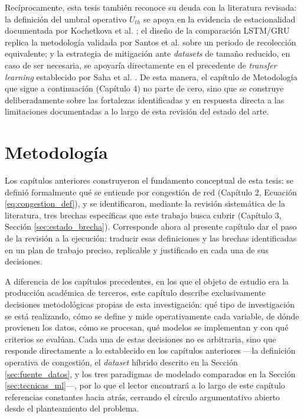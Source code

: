 \documentclass[12pt]{report}
\begin{document}
Recíprocamente, esta tesis también reconoce su deuda con la literatura revisada: la definición del umbral operativo $U_{th}$ se apoya en la evidencia de estacionalidad documentada por Kochetkova et al. \cite{kochetkova2023}; el diseño de la comparación LSTM/GRU replica la metodología validada por Santos et al. \cite{santos2022} sobre un periodo de recolección equivalente; y la estrategia de mitigación ante \textit{datasets} de tamaño reducido, en caso de ser necesaria, 
se apoyaría directamente en el precedente de \textit{transfer learning} establecido por Saha et al. \cite{saha2024}. De esta manera, el capítulo de Metodología que sigue a continuación (Capítulo 4) no parte de cero, sino que se construye deliberadamente sobre las fortalezas identificadas y en respuesta directa a las limitaciones documentadas a lo largo de esta revisión del estado del arte.

\chapter{Metodología}
\label{cap:metodologia}

Los capítulos anteriores construyeron el fundamento conceptual de esta tesis: se definió formalmente qué se entiende por congestión de red (Capítulo 2, Ecuación \ref{eq:congestion_def}), y se identificaron, mediante la revisión sistemática de la literatura, tres brechas específicas que este trabajo busca cubrir (Capítulo 3, Sección \ref{sec:estado_brecha}). Corresponde ahora al presente capítulo dar el paso de la revisión a la ejecución: traducir esas definiciones y las 
brechas identificadas en un plan de trabajo preciso, replicable y justificado en cada una de sus decisiones.

A diferencia de los capítulos precedentes, en los que el objeto de estudio era la producción académica de terceros, este capítulo describe exclusivamente decisiones metodológicas propias de esta investigación: qué tipo de investigación se está realizando, cómo se define y mide operativamente cada variable, de dónde provienen los datos, cómo se procesan, qué modelos se implementan y con qué criterios se evalúan. Cada una de estas decisiones no es arbitraria, sino que 
responde directamente a lo establecido en los capítulos anteriores ---la definición operativa de congestión, el \textit{dataset} híbrido descrito en la Sección \ref{sec:fuente_datos}, y los tres paradigmas de modelado comparados en la Sección \ref{sec:tecnicas_ml}---, por lo que el lector encontrará a lo largo de este capítulo referencias constantes hacia atrás, cerrando el círculo argumentativo abierto desde el planteamiento del problema.
\end{document}
